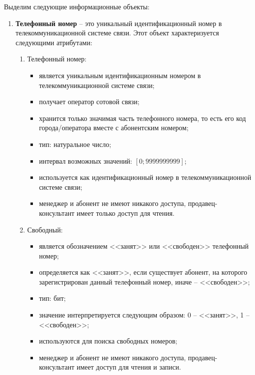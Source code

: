 Выделим следующие информационные объекты:
\begin{enumerate}
    \item \textbf{Телефонный номер} -- это уникальный идентификационный номер в телекоммуникационной системе связи. Этот объект характеризуется следующими атрибутами:
    \begin{enumerate}
        \item Телефонный номер:
        \begin{itemize}
            \item является уникальным идентификационным номером в телекоммуникационной системе связи;
            \item получает оператор сотовой связи;
            \item хранится только значимая часть телефонного номера, то есть его код города/оператора вместе с абонентским номером;
            \item тип: натуральное число;
            \item интервал возможных значений: $[0; 9 999 999 999]$;
            \item используется как идентификационный номер в телекоммуникационной системе связи;
            \item менеджер и абонент не имеют никакого доступа, продавец-консультант имеет только доступ для чтения.
        \end{itemize}

        \item Свободный:
        \begin{itemize}
            \item является обозначением <<занят>> или <<свободен>> телефонный номер;
            \item определяется как <<занят>>, если существует абонент, на которого зарегистрирован данный телефонный номер, иначе -- <<свободен>>;
            \item тип: бит;
            \item значение интерпретируется следующим образом: 0 -- <<занят>>, 1 -- <<свободен>>;
            \item используются для поиска свободных номеров;
            \item менеджер и абонент не имеют никакого доступа, продавец-консультант имеет доступ для чтения и записи.
        \end{itemize}
    \end{enumerate}


\end{enumerate}
